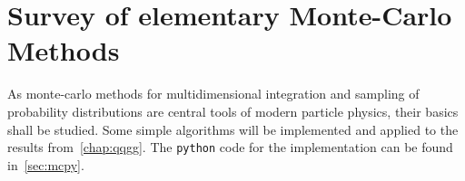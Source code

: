 
\chapter{Survey of elementary Monte-Carlo Methods}%
\label{chap:mc}

As monte-carlo methods for multidimensional integration and sampling
of probability distributions are central tools of modern particle
physics, their basics shall be studied.  Some simple algorithms will
be implemented and applied to the results from~\ref{chap:qqgg}. The
\verb|python| code for the implementation can be found
in~\ref{sec:mcpy}.
